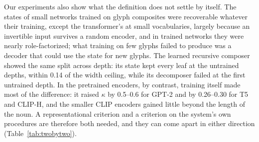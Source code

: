 \documentclass[10pt]{article}
\theoremstyle{plain}
\theoremstyle{remark}
\begin{document}
Our experiments also show what the definition does not settle by itself. The states of small networks trained on glyph composites were recoverable whatever their training, except the transformer's at small vocabularies, largely because an invertible input survives a random encoder, and in trained networks they were nearly role-factorized; what training on few glyphs failed to produce was a decoder that could use the state for new glyphs. The learned recursive composer showed the same split across depth: its state kept every leaf at the untrained depths, within 0.14 of the width ceiling, while its decomposer failed at the first untrained depth. In the pretrained encoders, by contrast, training itself made most of the difference: it raised $\kappa$ by 0.5--0.6 for GPT-2 and by 0.26--0.30 for T5 and CLIP-H, and the smaller CLIP encoders gained little beyond the length of the noun. A representational criterion and a criterion on the system's own procedures are therefore both needed, and they can come apart in either direction (Table~\ref{tab:twobytwo}).
\end{document}
